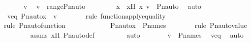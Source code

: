\begin{isabellebody}
\ \ \ \ \isamarkupfalse%
\ v\ \isamarkupfalse%
\ {\isachardoublequoteopen}v\ {\isasymin}\ range{\isacharparenleft}{\kern0pt}Pn{\isacharunderscore}{\kern0pt}auto{\isacharparenleft}{\kern0pt}{\isasymtau}{\isacharparenright}{\kern0pt}{\isacharparenright}{\kern0pt}{\isachardoublequoteclose}\ \isanewline
\ \ \ \ \isamarkupfalse%
\ \isamarkupfalse%
\ x\ \ xH{\isacharcolon}{\kern0pt}\ {\isachardoublequoteopen}{\isacharless}{\kern0pt}x{\isacharcomma}{\kern0pt}\ v{\isachargreater}{\kern0pt}\ {\isasymin}\ Pn{\isacharunderscore}{\kern0pt}auto{\isacharparenleft}{\kern0pt}{\isasymtau}{\isacharparenright}{\kern0pt}{\isachardoublequoteclose}\ \isamarkupfalse%
\ auto\ \isanewline
\ \ \ \ \isamarkupfalse%
\ \isamarkupfalse%
\ veq{\isacharcolon}{\kern0pt}\ {\isachardoublequoteopen}Pn{\isacharunderscore}{\kern0pt}auto{\isacharparenleft}{\kern0pt}{\isasymtau}{\isacharparenright}{\kern0pt}{\isacharbackquote}{\kern0pt}x\ {\isacharequal}{\kern0pt}\ v{\isachardoublequoteclose}\ \isanewline
\ \ \ \ \ \ \isamarkupfalse%
{\isacharparenleft}{\kern0pt}rule\ function{\isacharunderscore}{\kern0pt}apply{\isacharunderscore}{\kern0pt}equality{\isacharparenright}{\kern0pt}\isanewline
\ \ \ \ \ \ \isamarkupfalse%
{\isacharparenleft}{\kern0pt}rule\ Pn{\isacharunderscore}{\kern0pt}auto{\isacharunderscore}{\kern0pt}function{\isacharparenright}{\kern0pt}\isanewline
\ \ \ \ \ \ \isamarkupfalse%
\isanewline
\ \ \ \ \isamarkupfalse%
\ {\isachardoublequoteopen}Pn{\isacharunderscore}{\kern0pt}auto{\isacharparenleft}{\kern0pt}{\isasymtau}{\isacharparenright}{\kern0pt}{\isacharbackquote}{\kern0pt}x\ {\isasymin}\ P{\isacharunderscore}{\kern0pt}names{\isachardoublequoteclose}\ \isanewline
\ \ \ \ \ \ \isamarkupfalse%
{\isacharparenleft}{\kern0pt}rule\ Pn{\isacharunderscore}{\kern0pt}auto{\isacharunderscore}{\kern0pt}value{\isacharparenright}{\kern0pt}\isanewline
\ \ \ \ \ \ \isamarkupfalse%
\ assms\ xH\ Pn{\isacharunderscore}{\kern0pt}auto{\isacharunderscore}{\kern0pt}def\ \isanewline
\ \ \ \ \ \ \isamarkupfalse%
\ auto\isanewline
\ \ \ \ \isamarkupfalse%
\ \isamarkupfalse%
\ {\isachardoublequoteopen}v\ {\isasymin}\ P{\isacharunderscore}{\kern0pt}names{\isachardoublequoteclose}\ \isamarkupfalse%
\ veq\ \isamarkupfalse%
\ auto\ \isanewline
\ \ \ \ \isamarkupfalse%
\ \isamarkupfalse%

\end{isabellebody}
